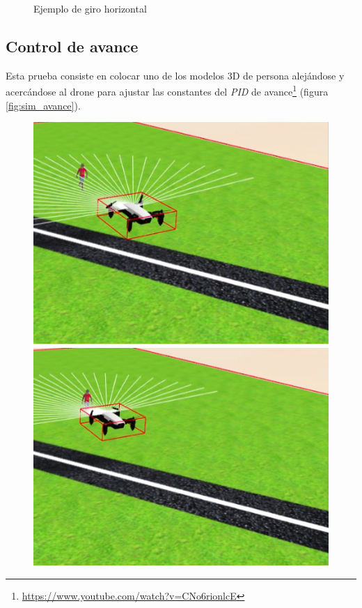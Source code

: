 \begin{figure}[!htb]
\endminipage\hfill
\caption{Ejemplo de giro horizontal}
\label{fig:sim_giro}
\end{figure}
\subsection{Control de avance}
Esta prueba consiste en colocar uno de los modelos 3D de persona alejándose y acercándose al drone para ajustar las constantes del \textit{PID} de avance\footnote{\url{https://www.youtube.com/watch?v=CNo6rionlcE}} (figura \ref{fig:sim_avance}).

\begin{figure}[!htb]
    \includegraphics[width=\linewidth]{figures/simulado/avance_1.png}
\endminipage\hfill
{}
    \includegraphics[width=\linewidth]{figures/simulado/avance_2.png}

\end{figure}
